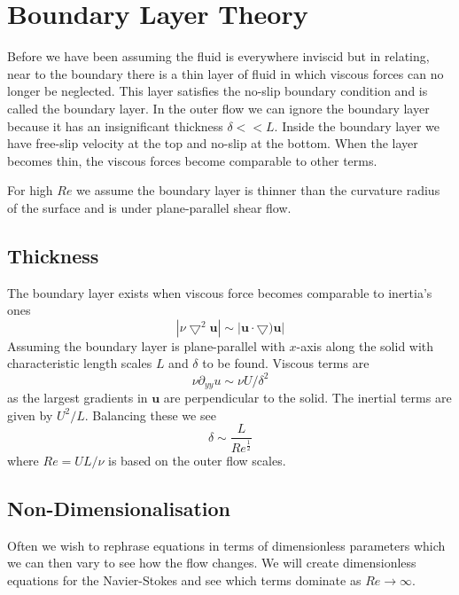 \documentclass[11pt]{article}
\newcommand{\grad}{\bigtriangledown}
\newcommand{\mv}[1]{\bm{#1}}
\newcommand{\mdf}[1]{{\color{red}#1}}
\newcommand{\abs}[1]{\left|#1\right|}
\begin{document}
\section{Boundary Layer Theory}
Before we have been assuming the fluid is everywhere inviscid but in relating, near to the boundary there is a thin layer of fluid in which viscous forces can no longer be neglected.
This layer satisfies the no-slip boundary condition and is called the \mdf{boundary layer}.
In the outer flow we can ignore the boundary layer because it has an insignificant thickness $\delta << L$.
Inside the boundary layer we have free-slip velocity at the top and no-slip at the bottom.
When the layer becomes thin, the viscous forces become comparable to other terms.

For high $Re$ we assume the boundary layer is thinner than the curvature radius of the surface and is under plane-parallel shear flow.

\subsection{Thickness}
The boundary layer exists when viscous force becomes comparable to inertia's ones
\[
\abs{\nu\grad^2\mv{u}} \sim \abs{\mv{u}\cdot\grad)\mv{u}}
\]
Assuming the boundary layer is plane-parallel with $x$-axis along the solid with characteristic length scales $L$ and $\delta$ to be found.
Viscous terms are
\[
	\nu\partial_{yy}u \sim \nu U / \delta^2
\]
as the largest gradients in $\mv{u}$ are perpendicular to the solid.
The inertial terms are given by $U^2/L$.
Balancing these we see
\[
	\delta \sim \frac{L}{Re^\frac{1}{2}}
\]
where $Re = UL/\nu$ is based on the outer flow scales.

\subsection{Non-Dimensionalisation}
Often we wish to rephrase equations in terms of dimensionless parameters which we can then vary to see how the flow changes.
We will create dimensionless equations for the Navier-Stokes and see which terms dominate as $Re\to\infty$.
\end{document}
